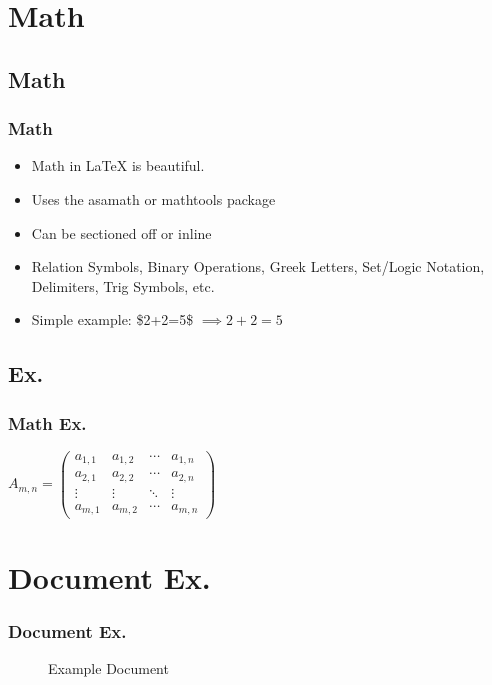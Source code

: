 \section{Math}

\subsection{Math}

\begin{frame}
\frametitle{Math}
\begin{itemize}
    \item Math in \LaTeX{} is beautiful.
    \item Uses the asamath or mathtools package
    \item Can be sectioned off or inline
    \item Relation Symbols, Binary Operations, Greek Letters, Set/Logic
        Notation, Delimiters, Trig Symbols, etc.
    \item Simple example: \$2+2=5\$ $\implies 2+2=5$
\end{itemize}
\end{frame}

\subsection{Ex.}

\begin{frame}
\frametitle{Math Ex.}
\begin{math}
A_{m,n} =
 \begin{pmatrix}
  a_{1,1} & a_{1,2} & \cdots & a_{1,n} \\
  a_{2,1} & a_{2,2} & \cdots & a_{2,n} \\
  \vdots  & \vdots  & \ddots & \vdots  \\
  a_{m,1} & a_{m,2} & \cdots & a_{m,n}
 \end{pmatrix}
 \end{math}
\end{frame}


\section{Document Ex.}

\begin{frame}
\frametitle{Document Ex.}
\begin{figure}[DocEx] 
\caption{Example Document}
\end{figure}
\end{frame}
